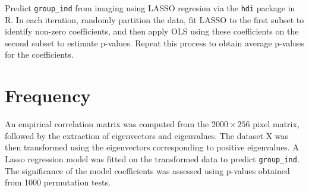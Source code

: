 \documentclass[12pt]{article}
\begin{document}
Predict \texttt{group\_ind} from imaging using LASSO regresion via the \texttt{hdi} package in R. In each iteration, randomly partition the data, fit LASSO to the first subset to identify non-zero coefficients, and then apply OLS using these coefficients on the second subset to estimate p-values. Repeat this process to obtain average p-values for the coefficients.

\section*{Frequency}

An empirical correlation matrix was computed from the \(2000 \times 256\) pixel matrix, followed by the extraction of eigenvectors and eigenvalues. The dataset X was then transformed using the eigenvectors corresponding to positive eigenvalues. A Lasso regression model was fitted on the transformed data to predict \texttt{group\_ind}. The significance of the model coefficients was assessed using p-values obtained from 1000 permutation tests.
\end{document}
